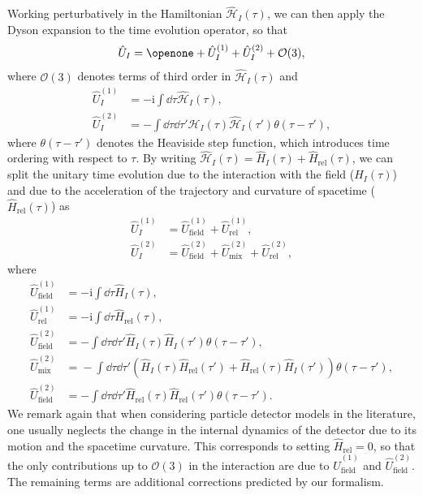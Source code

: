 \documentclass[prd,twocolumn,superscriptaddress,floatfix,amsmath,amssymb,amsfonts,longbibliography,nofootinbib]{revtex4-1}
\newcommand{\ii}{\mathrm{i}}
\begin{document}
Working perturbatively in the Hamiltonian $\hat{\mathcal{H}}_I(\tau)$, we can then apply the Dyson expansion to the time evolution operator, so that
\begin{equation}
    \hat{U}_I = \openone+\hat{U}_I^{(1)} + \hat{U}_I^{(2)}+\mathcal{O}(3), 
\end{equation}
where $\mathcal{O}(3)$ denotes terms of third order in $\hat{\mathcal{H}}_I(\tau)$ and
\begin{align}
    \hat{U}_I^{(1)} &= -\ii\int \dd \tau \hat{\mathcal{H}}_I(\tau),\\
    \hat{U}_I^{(2)} &= -\int \dd \tau\dd\tau' \hat{\mathcal{H}}_I(\tau)\hat{\mathcal{H}}_I(\tau')\theta(\tau-\tau'),
\end{align}
where $\theta(\tau-\tau')$ denotes the Heaviside step function, which introduces time ordering with respect to $\tau$. By writing $\hat{\mathcal{H}}_I(\tau) = \hat{{H}}_I(\tau)+\hat{{H}}_\text{rel}(\tau)$, we can split the unitary time evolution due to the interaction with the field ($\hat{{H}}_I(\tau)$) and due to the acceleration of the trajectory and curvature of spacetime ($\hat{{H}}_\text{rel}(\tau)$) as
\begin{align}
    \hat{U}_I^{(1)} &= \hat{U}_\text{field}^{(1)}+\hat{U}_\text{rel}^{(1)},\\
    \hat{U}_I^{(2)} &= \hat{U}_\text{field}^{(2)}+\hat{U}^{(2)}_{\text{mix}}+\hat{U}_\text{rel}^{(2)},
\end{align}
where
\begin{align}
    \hat{U}_\text{field}^{(1)}&= -\ii\int \dd\tau \hat{{H}}_I(\tau),\nonumber\\ \hat{U}_\text{rel}^{(1)}&= -\ii\int \dd\tau \hat{{H}}_\text{rel}(\tau)\nonumber,\\
    \hat{U}_\text{field}^{(2)}&= -\int \dd\tau\dd\tau' \hat{{H}}_I(\tau) \hat{{H}}_I(\tau')\theta(\tau-\tau'),\nonumber\\
    \hat{U}^{(2)}_{\text{mix}}\!&= \!-\!\!\int\!\! \dd\tau\dd\tau' \!\!\left(\!\hat{{H}}_I(\tau) \hat{{H}}_\text{rel}(\tau')\!+\!\! \hat{{H}}_\text{rel}(\tau)\hat{{H}}_I(\tau')\right)\!\theta(\tau\!-\!\tau')\nonumber,\\
    \hat{U}_\text{field}^{(2)}&= -\int \dd\tau\dd\tau' \hat{{H}}_\text{rel}(\tau) \hat{{H}}_\text{rel}(\tau')\theta(\tau-\tau').
\end{align}
We remark again that when considering particle detector models in the literature, one usually neglects the change in the internal dynamics of the detector due to its motion and the spacetime curvature. This corresponds to setting $\hat{H}_\text{rel} = 0$, so that the only contributions up to $\mathcal{O}(3)$ in the interaction are due to $\hat{U}_{\text{field}}^{(1)}$ and $\hat{U}_{\text{field}}^{(2)}$. The remaining terms are additional corrections predicted by our formalism.
\end{document}
